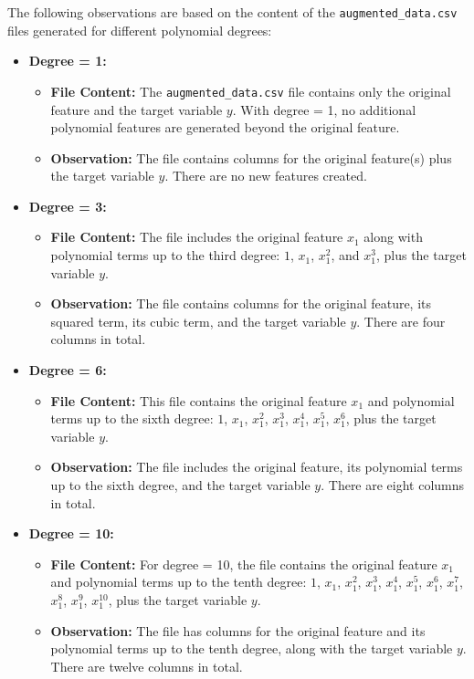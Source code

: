 The following observations are based on the content of the \verb|augmented_data.csv| files generated for different polynomial degrees:

\begin{itemize}
    \item \textbf{Degree = 1:}
    \begin{itemize}
        \item \textbf{File Content:} The \verb|augmented_data.csv| file contains only the original feature and the target variable \( y \). With degree = 1, no additional polynomial features are generated beyond the original feature.
        \item \textbf{Observation:} The file contains columns for the original feature(s) plus the target variable \( y \). There are no new features created.
    \end{itemize}
    
    \item \textbf{Degree = 3:}
    \begin{itemize}
        \item \textbf{File Content:} The file includes the original feature \( x_1 \) along with polynomial terms up to the third degree: \( 1 \), \( x_1 \), \( x_1^2 \), and \( x_1^3 \), plus the target variable \( y \).
        \item \textbf{Observation:} The file contains columns for the original feature, its squared term, its cubic term, and the target variable \( y \). There are four columns in total.
    \end{itemize}
    
    \item \textbf{Degree = 6:}
    \begin{itemize}
        \item \textbf{File Content:} This file contains the original feature \( x_1 \) and polynomial terms up to the sixth degree: \( 1 \), \( x_1 \), \( x_1^2 \), \( x_1^3 \), \( x_1^4 \), \( x_1^5 \), \( x_1^6 \), plus the target variable \( y \).
        \item \textbf{Observation:} The file includes the original feature, its polynomial terms up to the sixth degree, and the target variable \( y \). There are eight columns in total.
    \end{itemize}
    
    \item \textbf{Degree = 10:}
    \begin{itemize}
        \item \textbf{File Content:} For degree = 10, the file contains the original feature \( x_1 \) and polynomial terms up to the tenth degree: \( 1 \), \( x_1 \), \( x_1^2 \), \( x_1^3 \), \( x_1^4 \), \( x_1^5 \), \( x_1^6 \), \( x_1^7 \), \( x_1^8 \), \( x_1^9 \), \( x_1^{10} \), plus the target variable \( y \).
        \item \textbf{Observation:} The file has columns for the original feature and its polynomial terms up to the tenth degree, along with the target variable \( y \). There are twelve columns in total.
    \end{itemize}
\end{itemize}

